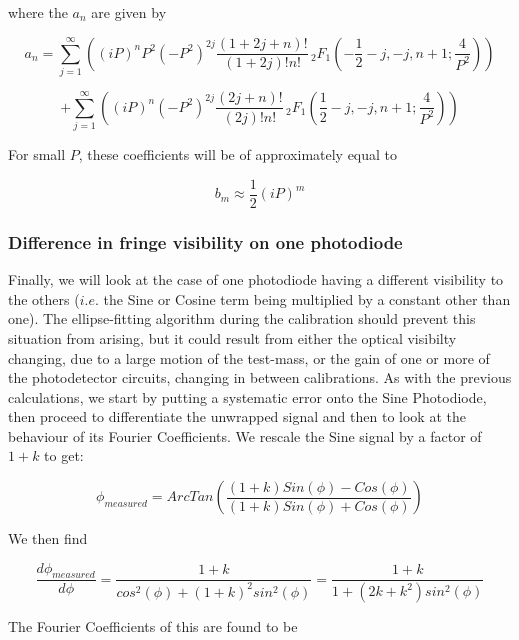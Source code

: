 \documentclass{article}
\begin{document}
where the $a_{n}$ are given by

\[
a_{n}=\sum_{j=1}^{\infty}\left((iP)^{n}P^{2}(-P^{2})^{2j}\frac{(1+2j+n)!}{(1+2j)!n!}\,_{2}F_{1}\left(-\frac{1}{2}-j,-j,n+1;\frac{4}{P^{2}}\right)\right)
\]


\begin{equation}
+\sum_{j=1}^{\infty}\left((iP)^{n}(-P^{2})^{2j}\frac{(2j+n)!}{(2j)!n!}\,_{2}F_{1}\left(\frac{1}{2}-j,-j,n+1;\frac{4}{P^{2}}\right)\right)
\end{equation}


For small $P$, these coefficients will be of approximately equal
to

\begin{equation}
b_{m}\approx\frac{1}{2}\left(iP\right)^{m}
\end{equation}



\subsubsection{Difference in fringe visibility on one photodiode}

Finally, we will look at the case of one photodiode having a different
visibility to the others ($i.e.$ the Sine or Cosine term being multiplied
by a constant other than one). The ellipse-fitting algorithm during
the calibration should prevent this situation from arising, but it
could result from either the optical visibilty changing, due to a
large motion of the test-mass, or the gain of one or more of the photodetector
circuits, changing in between calibrations. As with the previous calculations,
we start by putting a systematic error onto the Sine Photodiode, then
proceed to differentiate the unwrapped signal and then to look at
the behaviour of its Fourier Coefficients. We rescale the Sine signal
by a factor of $1+k$ to get:

\begin{equation}
\phi_{measured}=ArcTan\left(\frac{(1+k)Sin\left(\phi\right)-Cos\left(\phi\right)}{(1+k)Sin\left(\phi\right)+Cos\left(\phi\right)}\right)
\end{equation}


We then find

\begin{equation}
\frac{d\phi_{measured}}{d\phi}=\frac{1+k}{cos^{2}(\phi)+(1+k)^{2}sin^{2}(\phi)}=\frac{1+k}{1+(2k+k^{2})sin^{2}(\phi)}
\end{equation}


The Fourier Coefficients of this are found to be
\end{document}
